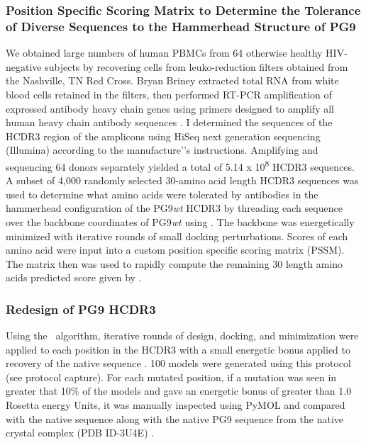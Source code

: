 \subsubsection{Position Specific Scoring Matrix to Determine the Tolerance of Diverse Sequences to the Hammerhead Structure of PG9}
We obtained large numbers of human PBMCs from 64 otherwise healthy HIV-negative subjects by recovering cells from leuko-reduction filters obtained from the Nashville, TN Red Cross. Bryan Briney extracted total RNA from white blood cells retained in the filters, then performed RT-PCR amplification of expressed antibody heavy chain genes using primers designed to amplify all human heavy chain antibody sequences \citep{Briney:2012ib}. I determined the sequences of the HCDR3 region of the amplicons using HiSeq next generation sequencing (Illumina) according to the manufacture'’s instructions. Amplifying and sequencing 64 donors separately yielded a total of 5.14 x 10\textsuperscript{8} HCDR3 sequences. A subset of 4,000 randomly selected 30-amino acid length HCDR3 sequences was used to determine what amino acids were tolerated by antibodies in the hammerhead configuration of the PG9\textit{wt} HCDR3 by threading each sequence over the backbone coordinates of PG9\textit{wt} using \rosetta. The backbone was energetically minimized with iterative rounds of small docking perturbations. Scores of each amino acid were input into a custom position specific scoring matrix (PSSM). The matrix then was used to rapidly compute the remaining 30 length amino acids predicted score given by \rosetta.

\subsubsection{Redesign of PG9 HCDR3}
Using the \rosettadesign~algorithm, iterative rounds of design, docking, and minimization were applied to each position in the HCDR3 with a small energetic bonus applied to recovery of the native sequence \citep{Kuhlman:2000tc}. 100 models were generated using this protocol (see protocol capture). For each mutated position, if a mutation was seen in greater that 10\% of the models and gave an energetic bonus of greater than 1.0 Rosetta energy Units, it was manually inspected using PyMOL and compared with the native sequence along with the native PG9 sequence from the native crystal complex (PDB ID-3U4E) \citep{McLellan:2011dg}.


